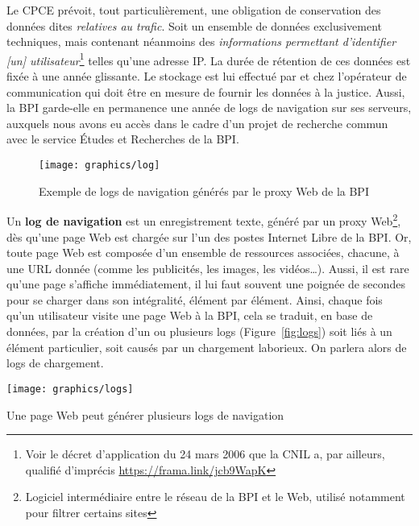 \documentclass[symmetric,justified,marginals=raggedouter]{tufte-book}
\begin{document}
Le CPCE prévoit, tout particulièrement, une obligation de conservation des données dites \og\textit{relatives au trafic}\fg{}. Soit un ensemble de données exclusivement techniques, mais contenant néanmoins des \og\textit{informations permettant d'identifier [un] utili\-sateur}\fg{}\footnote{\RaggedOuter Voir le décret d'application du 24 mars 2006 que la CNIL a, par ailleurs, qualifié d'imprécis \url{https://frama.link/jcb9WapK}} telles qu'une adresse IP. La durée de rétention de ces données est fixée à une année glissante. Le stockage est lui effectué par et chez l'opé\-rateur de communication qui doit être en mesure de fournir les données à la justice. Aussi, la BPI garde-elle en permanence une année de logs de navigation sur ses serveurs, auxquels nous avons eu accès dans le cadre d'un projet de recherche commun avec le service Études et Recherches de la BPI.

\begin{figure*}
  \texttt{[image: graphics/log]}
  \caption{Exemple de logs de navigation générés par le proxy Web de la BPI}
  \label{fig:log}
\end{figure*}

\noindent Un \textbf{log de navigation} est un enregistrement texte, généré par un proxy Web\footnote{\RaggedOuter Logiciel intermédiaire entre le réseau de la BPI et le Web, utilisé notamment pour filtrer certains sites}, dès qu'une page Web est chargée sur l'un des postes Internet Libre de la BPI. Or, toute page Web est composée d'un ensemble de ressources associées, chacune, à une URL donnée (comme les publicités, les images, les vidéos\ldots{}). Aussi, il est rare qu'une page s'affiche immédiatement, il lui faut souvent une poignée de secondes pour se charger dans son intégralité, élément par élément. Ainsi, chaque fois qu'un utilisateur visite une page Web à la BPI, cela se traduit, en base de données, par la création d'un ou plusieurs logs (Figure~\ref{fig:logs}) soit liés à un élément particulier, soit causés par un chargement laborieux. On parlera alors de logs de chargement.

\begin{marginfigure}%
  \texttt{[image: graphics/logs]}
  \vspace*{0.2cm}  
  \caption{Une page Web peut générer plusieurs logs de navigation}
  \label{fig:logs}
\end{marginfigure} 
\end{document}
